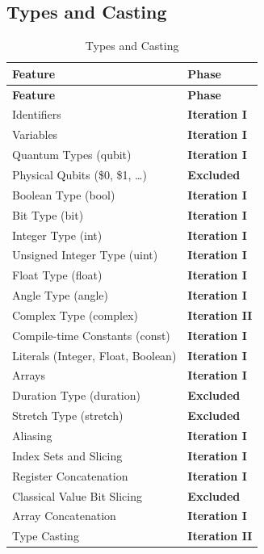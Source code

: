 \subsection{Types and Casting}
\begin{longtable}{@{}p{10cm}l@{}}
\caption{Types and Casting}\label{tab:types-casting}\\
\toprule
\textbf{Feature} & \textbf{Phase} \\
\midrule
\endfirsthead
\toprule
\textbf{Feature} & \textbf{Phase} \\
\midrule
\endhead
Identifiers & \textbf{Iteration I} \\
Variables & \textbf{Iteration I} \\
Quantum Types (qubit) & \textbf{Iteration I} \\
Physical Qubits (\$0, \$1, \ldots) & \textbf{Excluded} \\
Boolean Type (bool) & \textbf{Iteration I} \\
Bit Type (bit) & \textbf{Iteration I} \\
Integer Type (int) & \textbf{Iteration I} \\
Unsigned Integer Type (uint) & \textbf{Iteration I} \\
Float Type (float) & \textbf{Iteration I} \\
Angle Type (angle) & \textbf{Iteration I} \\
Complex Type (complex) & \textbf{Iteration II} \\
Compile-time Constants (const) & \textbf{Iteration I} \\
Literals (Integer, Float, Boolean) & \textbf{Iteration I} \\
Arrays & \textbf{Iteration I} \\
Duration Type (duration) & \textbf{Excluded} \\
Stretch Type (stretch) & \textbf{Excluded} \\
Aliasing & \textbf{Iteration I} \\
Index Sets and Slicing & \textbf{Iteration I} \\
Register Concatenation & \textbf{Iteration I} \\
Classical Value Bit Slicing & \textbf{Excluded} \\
Array Concatenation & \textbf{Iteration I} \\
Type Casting & \textbf{Iteration II} \\
\bottomrule
\end{longtable}

